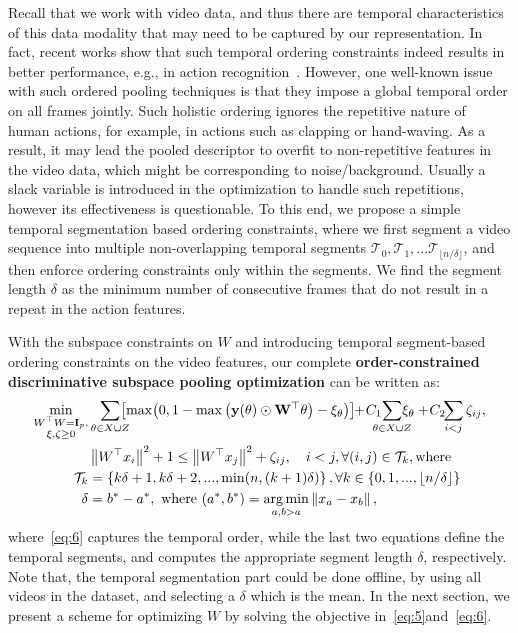 \documentclass[runningheads]{llncs}
\newcommand{\enorm}[1]{\left\|{#1}\right\|}
\newcommand{\set}[1]{\left\{#1\right\}}
\newcommand{\eye}[1]{\mathbf{I}_{#1}}
\renewcommand\cdots{...}
\DeclareMathOperator*{\argmin}{arg\,min}
\begin{document}
Recall that we work with video data, and thus there are temporal characteristics of this data modality that may need to be captured by our representation. In fact, recent works show that such temporal ordering constraints indeed results in better performance, e.g., in action recognition~\cite{grp,fernando2015modeling,bilen2016dynamic,bilen2017action}.  However, one well-known issue with such ordered pooling techniques is that they impose a global temporal order on all frames jointly. Such holistic ordering ignores the repetitive nature of human actions, for example, in actions such as clapping or hand-waving. As a result, it may lead the pooled descriptor to overfit to non-repetitive features in the video data, which might be corresponding to noise/background. Usually a slack variable is introduced in the optimization to handle such repetitions, however its effectiveness is questionable. To this end, we propose a simple temporal segmentation based ordering constraints, where we first segment a video sequence into multiple non-overlapping temporal segments $\mathcal{T}_0, \mathcal{T}_1,\cdots \mathcal{T}_{\lfloor n/\delta\rfloor}$, and then enforce ordering constraints only within the segments. We find the segment length $\delta$ as the minimum number of consecutive frames that do not result in a repeat in the action features.

With the subspace constraints on $W$ and introducing temporal segment-based ordering constraints on the video features, our complete \textbf{order-constrained discriminative subspace pooling optimization} can be written as:
\begin{align}
\label{eq:5}\min_{\substack{W^\top W = \eye{p},\\\xi,\zeta\geq 0}}&\sum_{\theta \in X\cup Z}\!\!\!\!\!\left[\max\!\left(0, 1-\max\left(\bf{y}(\theta) \odot W^\top \theta\right) - \xi_{\theta}\right)\right]\!\!+\!C_1\!\!\!\!\!\sum_{\theta\in X \cup Z}\!\!\!\!\!\xi_{\theta} +\!C_2\!\!\sum_{i<j} \zeta_{ij},\\
\label{eq:6}&\enorm{W^\top x_i}^2 + 1 \leq \enorm{W^\top x_j}^2 +\zeta_{ij}, \quad i<j, \forall (i,j)\in \mathcal{T}_k, \text{where}\\
\mathcal{T}_k &= \set{k\delta+1, k\delta+2,\cdots, \min(n,(k+1)\delta)}, \forall k\in\set{0,1,\cdots, \lfloor n/\delta\rfloor} \\
\delta & = b^*-a^*, \text{ where } (a^*,b^*) = \argmin_{a,b>a} \enorm{x_a - x_b},
\label{eq:3}
\end{align}
where~\eqref{eq:6} captures the temporal order, while the last two equations define the temporal segments, and computes the appropriate segment length $\delta$, respectively. Note that, the temporal segmentation part could be done offline, by using all videos in the dataset, and selecting a $\delta$ which is the mean. In the next section, we present a scheme for optimizing $W$ by solving the objective in~\eqref{eq:5}and~\eqref{eq:6}. 
\end{document}
